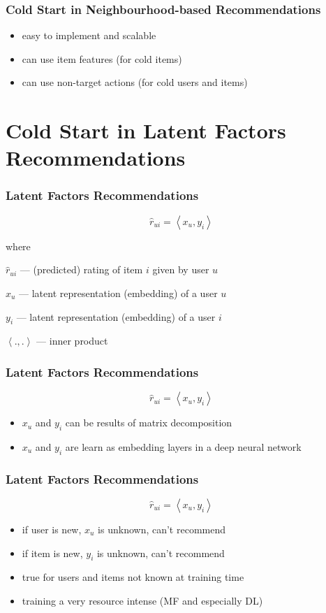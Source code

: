 \documentclass[t]{beamer}
\begin{document}
\begin{frame}
  \frametitle{Cold Start in Neighbourhood-based Recommendations} \begin{itemize}
\item easy to implement and scalable
\item can use item features (for cold items)
\item can use non-target actions (for cold users and items)
\end{itemize}
\end{frame}
\section{Cold Start in Latent Factors Recommendations}
\begin{frame}
  \frametitle{Latent Factors Recommendations}
  $$\hat{r}_{ui}=\left<x_u,y_i\right>$$

  where

  $\hat{r}_{ui}$ --- (predicted) rating of item $i$ given by user $u$
  
  $x_u$ --- latent representation (embedding) of a user $u$
  
  $y_i$ --- latent representation (embedding) of a user $i$
  
  $\left<.,.\right>$ --- inner product
\end{frame}  
\begin{frame}
  \frametitle{Latent Factors Recommendations}
  $$\hat{r}_{ui}=\left<x_u,y_i\right>$$
  \begin{itemize}
  \item $x_u$ and $y_i$ can be results of matrix decomposition
  \item $x_u$ and $y_i$ are learn as embedding layers in a deep neural network
  \end{itemize}
\end{frame}  
\begin{frame}
  \frametitle{Latent Factors Recommendations}
  $$\hat{r}_{ui}=\left<x_u,y_i\right>$$
  \begin{itemize}
  \item if user is new, $x_u$ is unknown, can't recommend
  \item if item is new, $y_i$ is unknown, can't recommend
  \item true for users and items not known at training time
  \item training a very resource intense (MF and especially DL)  
  \end{itemize}
\end{frame}  
\end{document}
